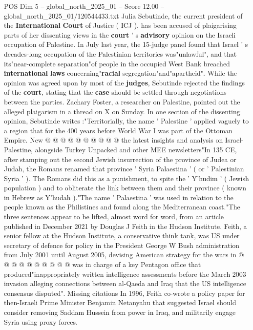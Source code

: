 \begin{textsample}{POS Dim 5 – global\_north\_2025\_01 – Score 12.00 – global\_north\_2025\_01/120544433.txt}  \label{ex:f5_pos_388}
Julia Sebutinde, the current president of the \textbf{International} \textbf{Court} of Justice ( ICJ ), has been accused of plaigarising parts of her dissenting views in the \textbf{court} ' s \textbf{advisory} opinion on the Israeli occupation of Palestine.
In July last year, the 15-judge panel found that Israel ' s decades-long occupation of the Palestinian territories was"unlawful", and that its"near-complete separation"of people in the occupied West Bank breached \textbf{international} \textbf{laws} concerning"\textbf{racial} segregation"and"apartheid".
While the opinion was agreed upon by most of the \textbf{judges}, Sebutinde rejected the findings of the \textbf{court}, stating that the \textbf{case} should be settled through negotiations between the parties.
Zachary Foster, a researcher on Palestine, pointed out the alleged plaigarism in a thread on X on Sunday.
In one section of the dissenting opinion, Sebutinde writes :"Territorially, the name ' Palestine ' applied vaguely to a region that for the 400 years before World War I was part of the Ottoman Empire.
New @ @ @ @ @ @ @ @ @ @ the latest insights and analysis on Israel-Palestine, alongside Turkey Unpacked and other MEE newsletters"In 135 CE, after stamping out the second Jewish insurrection of the province of Judea or Judah, the Romans renamed that province ' Syria Palaestina ' ( or ' Palestinian Syria ' ).
The Romans did this as a punishment, to spite the ' Y'hudim ' ( Jewish population ) and to obliterate the link between them and their province ( known in Hebrew as Y'hudah )."The name ' Palaestina ' was used in relation to the people known as the Philistines and found along the Mediterranean coast."The three sentences appear to be lifted, almost word for word, from an article published in December 2021 by Douglas J Feith in the Hudson Institute.
Feith, a senior fellow at the Hudson Institute, a conservative think tank, was US under secretary of defence for policy in the President George W Bush administration from July 2001 until August 2005, devising American strategy for the wars in @ @ @ @ @ @ @ @ @ @ was in charge of a key Pentagon office that produced"inappropriately written intelligence assessments before the March 2003 invasion alleging connections between al-Qaeda and Iraq that the US intelligence consensus disputed".
Missing citations In 1996, Feith co-wrote a policy paper for then-Israeli Prime Minister Benjamin Netanyahu that suggested Israel should consider removing Saddam Hussein from power in Iraq, and militarily engage Syria using proxy forces.

\end{textsample}
